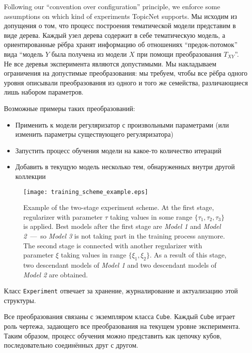 Following our ``convention over configuration'' principle, we enforce some assumptions on which kind of experiments TopicNet supports. 
Мы исходим из допущения о том, что процесс построения тематической модели представим в виде дерева. Каждый узел дерева содержит в себе тематическую модель, а ориентированные рёбра хранят информацию об отношениях ``предок-потомок'' вида ``модель $Y$ была получена из модели $X$ при помощи преобразования $T_{XY}$''. Не все деревья эксперимента являются допустимыми. Мы накладываем ограничения на допустимые преобразования: мы требуем, чтобы все рёбра одного уровня описывали преобразования из одного и того же семейства, различающиеся лишь набором параметров. 

Возможные примеры таких преобразований:

\begin{itemize}
    \item Применить к модели регуляризатор с произвольными параметрами (или изменить параметры существующего регуляризатора)
    \item Запустить процесс обучения модели на какое-то количество итераций
    \item Добавить в текущую модель несколько тем, обнаруженных внутри другой коллекции
\end{itemize}

\begin{figure}[t]
    \centering
    \texttt{[image: training\_scheme\_example.eps]}
    \caption{
        Example of the two-stage experiment scheme.
        At the first stage, regularizer with parameter $\tau$ taking values in some range $\{\tau_1, \tau_2, \tau_3\}$ is applied.
        Best models after the first stage are \emph{Model 1} and \emph{Model 2}~---~so \emph{Model 3} is not taking part in the training process anymore.
        The second stage is connected with another regularizer with parameter $\xi$ taking values in range $\{\xi_1, \xi_2\}$.
        As a result of this stage, two descendant models of \emph{Model 1} and two descendant models of \emph{Model 2} are obtained.
    }
\label{Training-scheme}
\end{figure}



Класс \texttt{Experiment} отвечает за хранение, журналирование и актуализацию этой структуры. 

Все преобразования связаны с экземпляром класса \texttt{Cube}. Каждый \texttt{Cube} играет роль чертежа, задающего все преобразования на текущем уровне эксперимента. Таким образом, процесс обучения можно представить как цепочку кубов, последовательно соединённых друг с другом.

